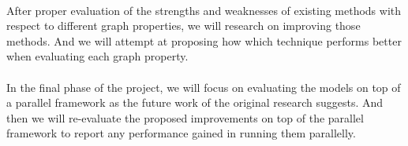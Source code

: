 \paragraph{}
After proper evaluation of the strengths and weaknesses of existing methods 
with respect to different graph properties, we will research on improving those 
methods. And we will attempt at proposing how which technique performs better 
when evaluating each graph property. 

\paragraph{}
In the final phase of the project, we will focus on evaluating the models on 
top of a parallel framework as the future work of the original research 
suggests\cite{kumarage_efficient_2017}. And then we will re-evaluate the proposed 
improvements on top of the parallel framework to report any performance 
gained in running them parallelly. 
